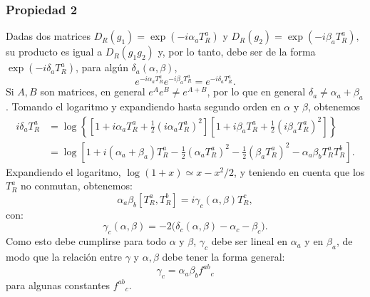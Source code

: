 \documentclass[a4paper,11pt]{book} %
\begin{document}
\subsubsection{Propiedad 2}
\noindent
Dadas dos matrices $
D_R(g_1)=\exp(-i\alpha_a T_R^a)$ y
$D_R(g_2)=\exp(-i\beta_a T_R^a),$ su producto es igual a $D_R(g_1g_2)$ y, por lo tanto, debe ser de la forma
$\exp(-i\delta_a T_R^a)$, para algún $\delta_a(\alpha,\beta)$,
\begin{equation}
e^{-i\alpha_a T_R^a} e^{-i\beta_a T_R^a}
=
e^{-i\delta_a T_R^a}.
\end{equation}
\noindent
Si $A,B$ son matrices, en general
$e^A e^B \neq e^{A+B}$, por lo que en general
$\delta_a \neq \alpha_a+\beta_a$. Tomando el logaritmo y expandiendo hasta
segundo orden en $\alpha$ y $\beta$, obtenemos
\begin{equation}
\begin{aligned}
i\delta_a T_R^a
&=
\log\left\{
\left[
1+i\alpha_a T_R^a
+\frac{1}{2}(i\alpha_a T_R^a)^2
\right]
\left[
1+i\beta_a T_R^a
+\frac{1}{2}(i\beta_a T_R^a)^2
\right]
\right\}
\\
&=
\log\left[
1+i(\alpha_a+\beta_a)T_R^a
-\frac{1}{2}(\alpha_a T_R^a)^2
-\frac{1}{2}(\beta_a T_R^a)^2
-\alpha_a\beta_b T_R^a T_R^b
\right].
\end{aligned}
\end{equation}
\noindent
Expandiendo el logaritmo, $\log(1+x)\simeq x-x^2/2$, y teniendo en cuenta
que los $T_R^a$ no conmutan, obtenemos:
\begin{equation}
\alpha_a \beta_b [T_R^a,T_R^b]
=
i\gamma_c(\alpha,\beta)T_R^c,
\end{equation}
con:
\[
\gamma_c(\alpha,\beta)
=
-2\bigl(\delta_c(\alpha,\beta)-\alpha_c-\beta_c\bigr).
\]
Como esto debe cumplirse para todo $\alpha$ y $\beta$, $\gamma_c$ debe ser
lineal en $\alpha_a$ y en $\beta_a$, de modo que la relación entre $\gamma$
y $\alpha,\beta$ debe tener la forma general:
\[
\gamma_c=\alpha_a\beta_b f^{ab}{}_{c}
\]
para algunas constantes $f^{ab}{}_{c}$. 
\end{document}

